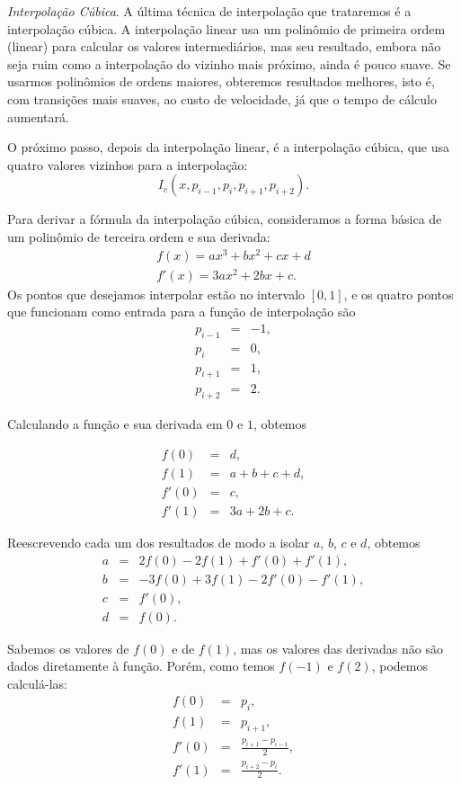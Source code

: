 \emph{Interpolação Cúbica}. A última técnica de interpolação que trataremos é a interpolação cúbica. A interpolação linear usa um polinômio de primeira ordem (linear) para calcular os valores intermediários, mas seu resultado, embora não seja ruim como a interpolação do vizinho mais próximo, ainda é pouco suave. Se usarmos polinômios de ordens maiores, obteremos resultados melhores, isto é, com transições mais suaves, ao custo de velocidade, já que o tempo de cálculo aumentará. 

O próximo passo, depois da interpolação linear, é a interpolação cúbica, que usa quatro valores vizinhos para a interpolação:
\[
 I_{c} (x, p_{i-1}, p_{i}, p_{i+1}, p_{i+2}).
\]  

Para derivar a fórmula da interpolação cúbica, consideramos a forma básica de um polinômio de terceira ordem e sua derivada:
\[
\begin{array}{l}
	f(x) = ax^3 + bx^2 + cx + d \\
f'(x) = 3ax^2 + 2bx + c.
\end{array}
\]
Os pontos que desejamos interpolar estão no intervalo $[0, 1]$, e os quatro pontos que funcionam como entrada para a função de interpolação são
\[
\begin{array}{rcl}
p_{i-1} & = & -1, \\
p_{i} & = & 0, \\
p_{i+1} & = & 1, \\
p_{i+2} & = & 2.
\end{array} 
\]

Calculando a função e sua derivada em $0$ e $1$, obtemos

\[
\begin{array}{rcl}
f(0) & = & d, \\
f(1) & = & a + b + c + d, \\
f'(0) & = & c, \\
f'(1) & = & 3a + 2b + c.
\end{array} 
\]

Reescrevendo cada um dos resultados de modo a isolar $a$, $b$, $c$ e $d$, obtemos
\[
\begin{array}{rcl}
a & = & 2f(0) - 2f(1) + f'(0) + f'(1), \\
b & = & -3f(0) + 3f(1) - 2f'(0) - f'(1), \\
c & = & f'(0), \\
d & = & f(0).
\end{array} 
\]

Sabemos os valores de $f(0)$ e de $f(1)$, mas os valores das derivadas não são dados diretamente à função. Porém, como temos $f(-1)$ e $f(2)$, podemos calculá-las:
\[
\begin{array}{rcl}
f(0) & = & p_{i}, \\
f(1) & = & p_{i+1}, \\
f'(0) & = & \frac{p_{i+1} - p_{i-1}}{2}, \\
f'(1) & = & \frac{p_{i+2} - p_{i}}{2}.
\end{array} 
\]

